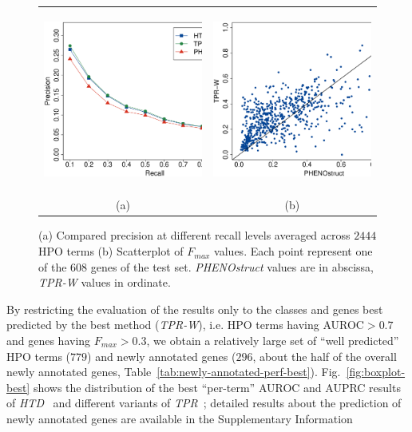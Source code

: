 \documentclass{bioinfo}
\newcommand{\htd}{{\em HTD}}
\newcommand{\tpr}{{\em TPR}}
\begin{document}
\begin{figure}[!ht]
\centering
\begin{tabular}{cc}	
\includegraphics[width=8.0cm, height=6cm]{Fig_ExpII/PXR_curves_Shrink_NOfilter.eps} &    
\includegraphics[width=8.0cm, height=6cm]{Fig_ExpII/ScatterPlot_Shrink_Fmax_NOfilter.eps} \\
(a) & (b)\\ 
\end{tabular}
\caption{(a) Compared precision at different recall levels averaged across $2444$ HPO terms (b) Scatterplot of $F_{max}$ values. Each point represent one of the $608$ genes of the test set. {\em PHENOstruct} values are in abscissa, {\em TPR-W} values in ordinate.}
\label{fig:pxr-FmaxScatter}
\end{figure}


By restricting the evaluation of the results only to the classes and genes best predicted  by the best method (\textsl{TPR-W}), i.e. HPO terms having AUROC$>0.7$ and genes having $F_{max} > 0.3$, we obtain a relatively large set of ``well predicted'' HPO terms ($779$) and newly annotated genes ($296$, about the half of the overall newly annotated genes, Table~\ref{tab:newly-annotated-perf-best}). Fig.~\ref{fig:boxplot-best} shows the distribution of the best ``per-term'' AUROC and AUPRC results of \htd~ and different variants of \tpr~; detailed results about the prediction of newly annotated genes are available in the Supplementary Information 
\end{document}
